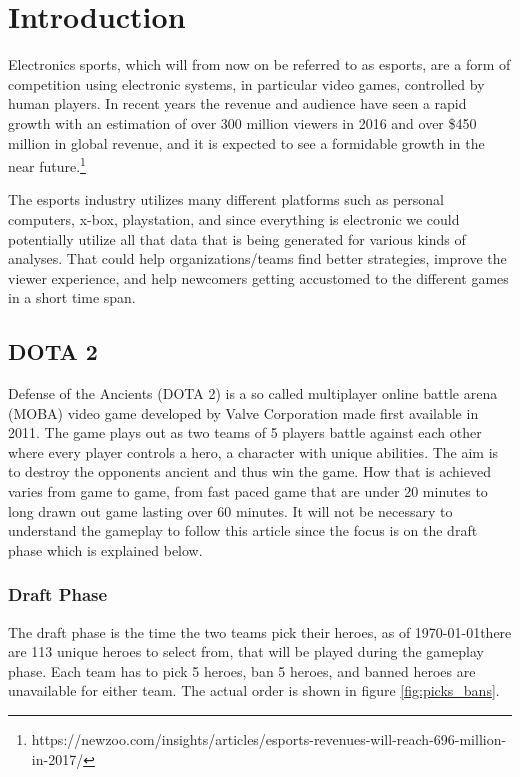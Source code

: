 \documentclass[report.tex]{subfiles}
\begin{document}
\section*{\centering Introduction}

Electronics sports, which will from now on be referred to as esports, are a form of competition using electronic systems, in particular video games, controlled by human players. In recent years the revenue and audience have seen a rapid growth with an estimation of over 300 million viewers in 2016 and over \$450 million in global revenue, and it is expected to see a formidable growth in the near future.\footnote{https://newzoo.com/insights/articles/esports-revenues-will-reach-696-million-in-2017/}

The esports industry utilizes many different platforms such as personal computers, x-box, playstation, and since everything is electronic we could potentially utilize all that data that is being generated for various kinds of analyses. That could help organizations/teams find better strategies, improve the viewer experience, and help newcomers getting accustomed to the different games in a short time span.

\subsection*{DOTA 2}

Defense of the Ancients (DOTA 2) is a so called multiplayer online battle arena (MOBA) video game developed by Valve Corporation made first available in 2011. The game plays out as two teams of 5 players battle against each other where every player controls a hero, a character with unique abilities. The aim is to destroy the opponents ancient and thus win the game. How that is achieved varies from game to game, from fast paced game that are under 20 minutes to long drawn out game lasting over 60 minutes. It will not be necessary to understand the gameplay to follow this article since the focus is on the draft phase which is explained below.

\subsubsection*{Draft Phase}

The draft phase is the time the two teams pick their heroes, as of \today there are 113 unique heroes to select from, that will be played during the gameplay phase. Each team has to pick 5 heroes, ban 5 heroes, and banned heroes are unavailable for either team. The actual order is shown in figure \ref{fig:picks_bans}.
\end{document}
